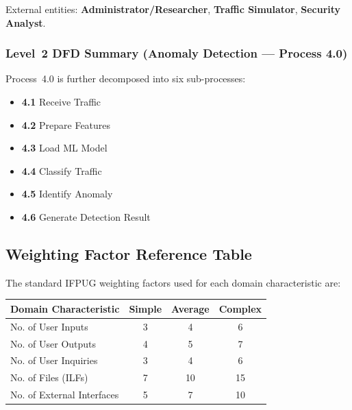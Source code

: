 \documentclass[11pt, a4paper]{article}
\begin{document}
External entities: \textbf{Administrator/Researcher}, \textbf{Traffic Simulator}, \textbf{Security Analyst}.

\subsubsection{Level~2 DFD Summary (Anomaly Detection --- Process 4.0)}
Process~4.0 is further decomposed into six sub-processes:
\begin{itemize}
    \item \textbf{4.1} Receive Traffic
    \item \textbf{4.2} Prepare Features
    \item \textbf{4.3} Load ML Model
    \item \textbf{4.4} Classify Traffic
    \item \textbf{4.5} Identify Anomaly
    \item \textbf{4.6} Generate Detection Result
\end{itemize}

\newpage
\subsection{Weighting Factor Reference Table}

The standard IFPUG weighting factors used for each domain characteristic are:

\begin{center}
\begin{tabular}{|l|c|c|c|}
\hline
\textbf{Domain Characteristic} & \textbf{Simple} & \textbf{Average} & \textbf{Complex} \\ \hline
No. of User Inputs             & 3               & 4                & 6                \\ \hline
No. of User Outputs            & 4               & 5                & 7                \\ \hline
No. of User Inquiries          & 3               & 4                & 6                \\ \hline
No. of Files (ILFs)            & 7               & 10               & 15               \\ \hline
No. of External Interfaces     & 5               & 7                & 10               \\ \hline
\end{tabular}
\end{center}
\end{document}
